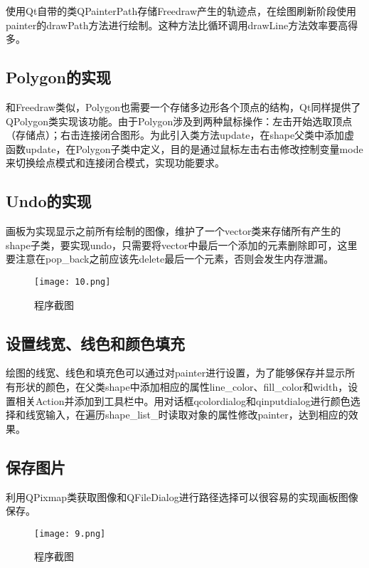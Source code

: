 \documentclass[14pt]{scrartcl} %
\begin{document}
使用Qt自带的类QPainterPath存储Freedraw产生的轨迹点，在绘图刷新阶段使用painter的drawPath方法进行绘制。这种方法比循环调用drawLine方法效率要高得多。


\subsection{Polygon的实现}

和Freedraw类似，Polygon也需要一个存储多边形各个顶点的结构，Qt同样提供了QPolygon类实现该功能。由于Polygon涉及到两种鼠标操作：左击开始选取顶点（存储点）；右击连接闭合图形。为此引入类方法update，在shape父类中添加虚函数update，在Polygon子类中定义，目的是通过鼠标左击右击修改控制变量mode来切换绘点模式和连接闭合模式，实现功能要求。

\subsection{Undo的实现}

画板为实现显示之前所有绘制的图像，维护了一个vector类来存储所有产生的shape子类，要实现undo，只需要将vector中最后一个添加的元素删除即可，这里要注意在pop\_back之前应该先delete最后一个元素，否则会发生内存泄漏。

\begin{figure}[h] %
	\centering
	\texttt{[image: 10.png]} %
	\caption{程序截图}
\end{figure}

\pagebreak
\subsection{设置线宽、线色和颜色填充}
绘图的线宽、线色和填充色可以通过对painter进行设置，为了能够保存并显示所有形状的颜色，在父类shape中添加相应的属性line\_color、fill\_color和width，设置相关Action并添加到工具栏中。用对话框qcolordialog和qinputdialog进行颜色选择和线宽输入，在遍历shape\_list\_时读取对象的属性修改painter，达到相应的效果。

\subsection{保存图片}
利用QPixmap类获取图像和QFileDialog进行路径选择可以很容易的实现画板图像保存。

\begin{figure}[h] %
	\centering
	\texttt{[image: 9.png]} %
	\caption{程序截图}
\end{figure}
\end{document}
